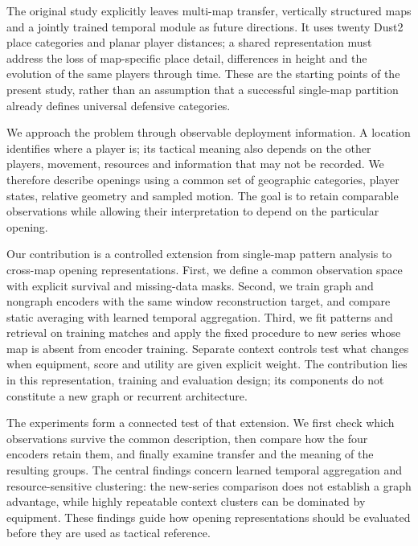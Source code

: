 The original study explicitly leaves multi-map transfer, vertically structured maps and a jointly trained temporal module as future directions. It uses twenty Dust2 place categories and planar player distances; a shared representation must address the loss of map-specific place detail, differences in height and the evolution of the same players through time. These are the starting points of the present study, rather than an assumption that a successful single-map partition already defines universal defensive categories. %

We approach the problem through observable deployment information. A location identifies where a player is; its tactical meaning also depends on the other players, movement, resources and information that may not be recorded. We therefore describe openings using a common set of geographic categories, player states, relative geometry and sampled motion. The goal is to retain comparable observations while allowing their interpretation to depend on the particular opening.

Our contribution is a controlled extension from single-map pattern analysis to cross-map opening representations. First, we define a common observation space with explicit survival and missing-data masks. Second, we train graph and nongraph encoders with the same window reconstruction target, and compare static averaging with learned temporal aggregation. Third, we fit patterns and retrieval on training matches and apply the fixed procedure to new series whose map is absent from encoder training. Separate context controls test what changes when equipment, score and utility are given explicit weight. The contribution lies in this representation, training and evaluation design; its components do not constitute a new graph or recurrent architecture. %

The experiments form a connected test of that extension. We first check which observations survive the common description, then compare how the four encoders retain them, and finally examine transfer and the meaning of the resulting groups. The central findings concern learned temporal aggregation and resource-sensitive clustering: the new-series comparison does not establish a graph advantage, while highly repeatable context clusters can be dominated by equipment. These findings guide how opening representations should be evaluated before they are used as tactical reference.

